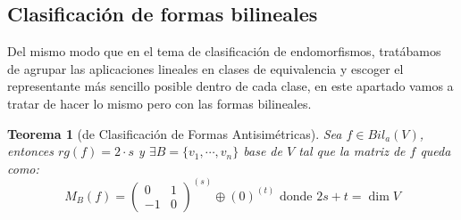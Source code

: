 \documentclass[10pt,a4paper,openright]{book}
\theoremstyle{break}
\newtheorem*{theo}{Teorema}
\begin{document}
\subsection{Clasificación de formas bilineales}
Del mismo modo que en el tema de clasificación de endomorfismos, tratábamos de agrupar las aplicaciones lineales en clases de equivalencia y escoger el representante más sencillo posible dentro de cada clase, en este apartado vamos a tratar de hacer lo mismo pero con las formas bilineales.

\begin{theo}[de Clasificación de Formas Antisimétricas]
Sea $f\in Bil_a(V)$, entonces $rg(f) = 2\cdot s$ y $\exists B =\{v_1, \cdots, v_n\}$ base de $V$ tal que la matriz de $f$ queda como:
$$M_B(f) = \begin{pmatrix} 0 & 1 \\ -1 & 0 \end{pmatrix}^{(s)}\oplus (0)^{(t)}\mbox{ donde }2s+t=\dim V$$
\end{theo}
\end{document}
